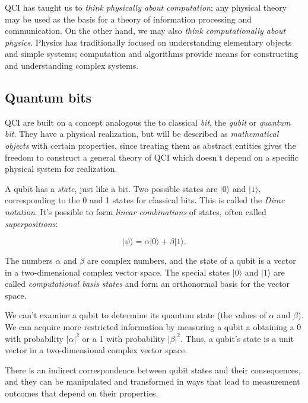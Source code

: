 \documentclass{article}
\numberwithin{equation}{section}
\newcommand{\bracket}[1]{|#1\rangle}
\begin{document}
QCI has taught us to \textit{think physically about computation}; any physical theory may be used as the basis for a theory of information processing and communication. On the other hand, we may also \textit{think computationally about physics}. Physics has traditionally focused on understanding elementary objects and simple systems; computation and algorithms provide means for constructing and understanding complex systems.

\subsection{Quantum bits}

QCI are built on a concept analogous the to classical \textit{bit}, the \textit{qubit} or \textit{quantum bit}. They have a physical realization, but will be described as \textit{mathematical objects} with certain properties, since treating them as abstract entities gives the freedom to construct a general theory of QCI which doesn't depend on a specific physical system for realization.

A qubit has a \textit{state}, just like a bit. Two possible states are $\bracket{0}$ and $\bracket{1}$, corresponding to the 0 and 1 states for classical bits. This is called the \textit{Dirac notation}. It's possible to form \textit{linear combinations} of states, often called \textit{superpositions}:

\begin{equation} \label{eq:1.1}
\bracket{\psi} = \alpha \bracket{0} + \beta \bracket{1}.
\end{equation}

The numbers $\alpha$ and $\beta$ are complex numbers, and the state of a qubit is a vector in a two-dimensional complex vector space. The special states $\bracket{0}$ and $\bracket{1}$ are called \textit{computational basis states} and form an orthonormal basis for the vector space.

We can't examine a qubit to determine its quantum state (the values of $\alpha$ and $\beta$). We can acquire more restricted information by measuring a qubit a obtaining a 0 with probability $|\alpha|^2$ or a 1 with probability $|\beta|^2$. Thus, a qubit's state is a unit vector in a two-dimensional complex vector space.

There is an indirect correspondence between qubit states and their consequences, and they can be manipulated and transformed in ways that lead to measurement outcomes that depend on their properties.
\end{document}
